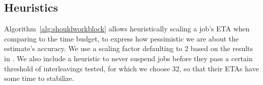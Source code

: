 

\subsection{Heuristics}
Algorithm~\ref{alg:shouldworkblock} allows heuristically scaling a job's ETA when comparing to the time budget,
to express how pessimistic we are about the estimate's accuracy.
We use a scaling factor defaulting to 2 based on the results in \cite{estimation}.
We also include a heuristic to
never suspend jobs before they pass a certain threshold of interleavings tested,
for which we choose 32,
so that their ETAs have some time to stabilize.

